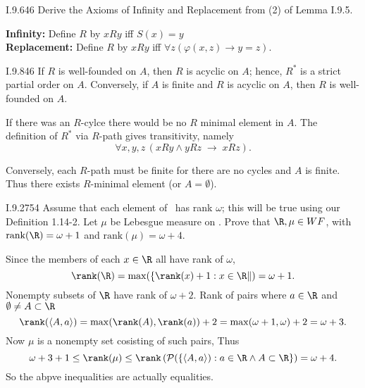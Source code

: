 \begin{lexcopy}{I.9.6}{46}
  Derive the Axioms of Infinity and Replacement from (2) of Lemma I.9.5.
\end{lexcopy}
\textbf{Infinity:} Define $R$ by \(xRy\) iff \(S(x) = y\)
\\
\textbf{Replacement:} Define $R$ by \(xRy\) iff
\(\forall z(\varphi(x, z) \to y = z)\).

\begin{lexcopy}{I.9.8}{46}
  If $R$ is well-founded on $A$, then $R$ is acyclic on $A$; hence, \(R^*\)
  is a strict partial order on $A$.
  Conversely, if $A$ is finite and $R$ is acyclic on $A$,
then $R$ is well-founded on $A$.
\end{lexcopy}
If there was an $R$-cylce there would be no $R$ minimal element in $A$.
The definition of \(R^*\) via $R$-path gives transitivity, namely
\begin{equation*}
\forall x,y,z\,\left(xRy \wedge yRz \;\to\; xRz\right).
\end{equation*}

Conversely, each $R$-path must be finite for there are no cycles
and $A$ is finite. Thus there exists $R$-minimal element
(or \(A=\emptyset\)).

\begin{lexcopy}{I.9.27}{54}
  Assume that each element of \R\ has rank \(\omega\);
  this will be true
using our Definition 1.14-2. Let \(\mu\) be Lebesgue measure on \R. Prove that
\(\R,\mu \in WF\), with \(\textrm{rank}(\R) = \omega + 1\)
and \(\textrm{rank}(\mu) = \omega + 4\).
\end{lexcopy}
Since the members of each \(x\in \R\) all have rank of \(\omega\),
\begin{equation*}
\rank(\R)=\max(\{\rank(x)+1: x\in\R\|) = \omega+1.
\end{equation*}
Nonempty subsets of \(\R\) have rank of \(\omega+2\).
Rank of pairs where \(a\in\R\) and \(\emptyset \neq A \subset \R\)
\begin{equation*}
\rank(\langle A, a\rangle)
 = \max(\rank(A),\rank(a)) + 2
 = \max(\omega+1,\omega) + 2 = \omega + 3.
\end{equation*}
Now \(\mu\) is a nonempty set cosisting of such pairs,
Thus
\begin{equation*}
\omega + 3 + 1 \leq \rank(\mu)
\leq \rank\left(
  \mathcal{P}(\{\langle A, a\rangle): a\in\R \wedge A\subset\R\}
   \right)
= \omega + 4.
\end{equation*}
So the abpve inequalities are actually equalities.

